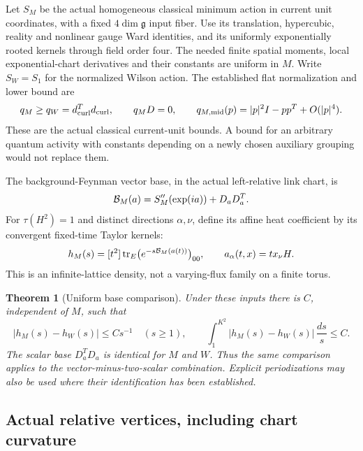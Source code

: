 \documentclass[11pt]{article}
\newtheorem{theorem}{Theorem}[section]
\theoremstyle{remark}
\begin{document}
Let \(S_M\) be the actual homogeneous classical minimum action in current
unit coordinates, with a fixed \(4\dim\mathfrak g\) input fiber.
Use its translation, hypercubic, reality and nonlinear gauge Ward
identities, and its uniformly exponentially rooted kernels through field
order four. The needed finite spatial moments, local exponential-chart
derivatives and their constants are uniform in \(M\).
Write \(S_W=S_1\) for the normalized Wilson action. The established flat
normalization and lower bound are
\begin{equation}
 q_M\ge q_W=d_{\rm curl}^{T}d_{\rm curl},\qquad q_MD=0,\qquad
 q_{M,\mathrm{mid}}(p)=|p|^2I-pp^T+O(|p|^4).
 \label{abw-input}
\end{equation}
These are the actual classical current-unit bounds. A bound for an
arbitrary quantum activity with constants depending on a newly chosen
auxiliary grouping would not replace them.

The background-Feynman vector base, in the actual left-relative link
chart, is
\[
 {\cal B}_M(a)=S_M''(\exp(ia))+D_aD_a^T.
\]
For \(\tau(H^2)=1\) and distinct directions \(\alpha,\nu\), define its
affine heat coefficient by its convergent fixed-time Taylor kernels:
\begin{equation}
 h_M(s)=[t^2]\operatorname{tr}_{E}
 \bigl(e^{-s{\cal B}_M(a(t))}\bigr)_{00},\qquad
 a_\alpha(t,x)=t x_\nu H.
 \label{abw-h}
\end{equation}
This is an infinite-lattice density, not a varying-flux family on a
finite torus.

\begin{theorem}[Uniform base comparison]
\label{abw-main}
Under these inputs there is \(C\), independent of \(M\), such that
\begin{equation}
 |h_M(s)-h_W(s)|\le C s^{-1}\quad(s\ge1),\qquad
 \int_1^{K^2}|h_M(s)-h_W(s)|\,\frac{ds}{s}\le C.
 \label{abw-bound}
\end{equation}
The scalar base \(D_a^TD_a\) is identical for \(M\) and \(W\).
Thus the same comparison applies to the vector-minus-two-scalar
combination. Explicit periodizations may also be used where their
identification has been established.
\end{theorem}

\subsection{Actual relative vertices, including chart curvature}
\label{abw-chart-section}
\end{document}
